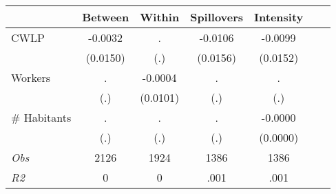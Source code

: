 \begin{tabular}{l*{6}{c}}\hline&\multicolumn{1}{c}{Between}&\multicolumn{1}{c}{Within}&\multicolumn{1}{c}{Spillovers}&\multicolumn{1}{c}{Intensity}\\ \hline 
CWLP & -0.0032 & . & -0.0106 & -0.0099 \\
 & (0.0150) & (.) & (0.0156) & (0.0152) \\
Workers & . & -0.0004 & . & . \\
 & (.) & (0.0101) & (.) & (.) \\
\# Habitants & . & . & . & -0.0000 \\
  & (.) & (.) & (.) & (0.0000) \\
\hline \textit{Obs} & 2126 & 1924 & 1386 & 1386  \\ \textit{R2} & 0 & 0 & .001 & .001 \\ \hline \end{tabular}
